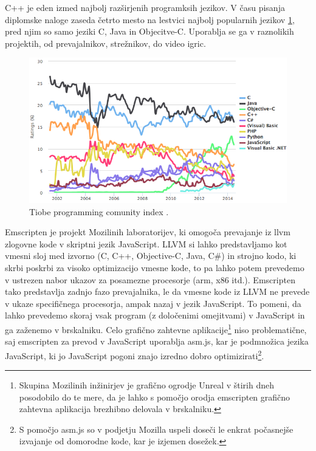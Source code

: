 C++ je eden izmed najbolj razširjenih programksih jezikov. V času pisanja diplomske naloge zaseda četrto mesto na lestvici najbolj popularnih jezikov \ref{fig:tiobe-index}, pred njim so samo jeziki C, Java in Objecitve-C. Uporablja se ga v raznolikih projektih, od prevajalnikov, strežnikov, do video igric.

\begin{figure}
 \includegraphics[width=\linewidth]{tiobe-index}
 \caption{Tiobe programming comunity index \cite{tiobe}.}
 \label{fig:tiobe-index}
\end{figure}

Emscripten je projekt Mozilinih laboratorijev, ki omogoča prevajanje iz \gls{llvm} zlogovne kode v skriptni jezik JavaScript. LLVM si lahko predstavljamo kot vmesni sloj med izvorno (C, C++, Objective-C, Java, C\#) in strojno kodo, ki skrbi poskrbi za visoko optimizacijo vmesne kode, to pa lahko potem prevedemo v ustrezen nabor ukazov za posamezne procesorje (\gls{arm}, x86 itd.). Emscripten tako predstavlja zadnjo fazo prevajalnika, le da vmesne kode iz LLVM ne prevede v ukaze specifičnega procesorja, ampak nazaj v jezik JavaScript. To pomeni, da lahko prevedemo skoraj vsak program (z določenimi omejitvami) v JavaScript in ga zaženemo v brskalniku. Celo grafično zahtevne aplikacije\footnote{Skupina Mozilinih inžinirjev je grafično ogrodje Unreal v štirih dneh posodobilo do te mere, da je lahko s pomočjo orodja emscripten grafično zahtevna aplikacija brezhibno delovala v brskalniku\cite{epic-citadel}.} niso problematične, saj emscripten za prevod v JavaScript uporablja asm.js\cite{asmjs}, kar je podmnožica jezika JavaScript, ki jo JavaScript pogoni znajo izredno dobro optimizirati\footnote{S pomočjo asm.js so v podjetju Mozilla uspeli doseči le enkrat počasnejše izvajanje od domorodne kode, kar je izjemen dosežek.\cite{mozilla-asmjs}}.

